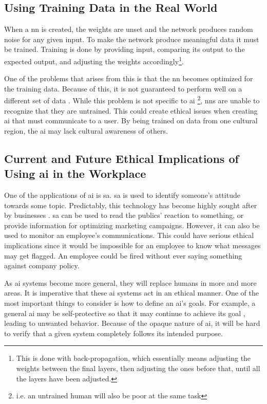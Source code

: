 \documentclass[11pt]{article}
\begin{document}
\subsection{Using Training Data in the Real World}
\label{sec:orgfff31c1}
When a \gls{nn} is created, the weights are unset and the network produces random noise for any given input.
To make the network produce meaningful data it must be trained.
Training is done by providing input, comparing its output to the expected output, and adjusting the weights accordingly\footnote{This is done with back-propagation, which essentially means adjusting the weights between the final layers, then adjusting the ones before that, until all the layers have been adjusted.}.

One of the problems that arises from this is that the \gls{nn} becomes optimized for the training data.
Because of this, it is not guaranteed to perform well on a different set of data \citep{amodei2016}. 
While this problem is not specific to \gls{ai} \footnote{i.e. an untrained human will also be poor at the same task}, \glspl{nn} are unable to recognize that they are untrained.
This could create ethical issues when creating \gls{ai} that must communicate to a user.
By being trained on data from one cultural region, the \gls{ai} may lack cultural awareness of others.



\subsection{Current and Future Ethical Implications of Using \acrshort{ai} in the Workplace}
\label{sec:orgf69f2bb}
One of the applications of \gls{ai} is \Gls{sa}.
\gls{sa} is used to identify someone's attitude towards some topic.
Predictably, this technology has become highly sought after by businesses \citep{alexandra2014}.
\Gls{sa} can be used to read the publics' reaction to something, or provide information for optimizing marketing campaigns.
However, it can also be used to monitor an employee's communications.
This could have serious ethical implications since it would be impossible for an employee to know what messages may get flagged.
An employee could be fired without ever saying something against company policy.

As \gls{ai} systems become more general, they will replace humans in more and more areas.
It is imperative that these \gls{ai} systems act in an ethical manner.
One of the most important things to consider is how to define an \gls{ai}'s goals.
For example, a general \gls{ai} may be self-protective so that it may continue to achieve its goal \citep{omohundro2014}, leading to unwanted behavior.
Because of the opaque nature of \gls{ai}, it will be hard to verify that a given system completely follows its intended purpose.
\end{document}
